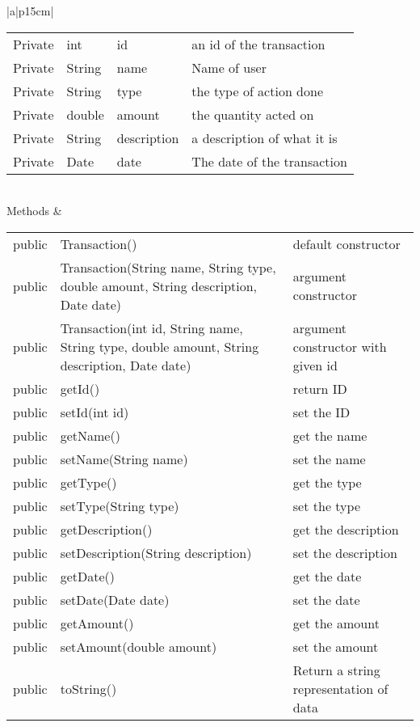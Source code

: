 \documentclass[12pt]{article}
\begin{document}
\begin{table}
\begin{tabular}{|a|p{15cm}|}
\begin{tabular}{| p{2cm} | p{2cm} | p{3cm} | p{6.45cm} |}
			Private & int & id & an id of the transaction \\
			Private & String & name & Name of user\\
			Private & String & type & the type of action done \\
			Private & double & amount & the quantity acted on \\
			Private & String & description & a description of what it is \\
			Private & Date & date & The date of the transaction \\
		\end{tabular} \\
		\hline
		Methods & 		 
		\begin{tabular}{| p{2cm} | p{5cm} | p{6.9cm} |}
			\hline
			\rowcolor{gray}
			\mc{1}{Visibility} &\mc{1}{Name} & \mc{1}{Description} \\
			\hline
			\rowcolor{white}
			public &  Transaction() & default constructor\\
			\hline
			public &  Transaction(String name, String type, double amount, String description, Date date) & argument constructor\\
			\hline
			public & Transaction(int id, String name, String type, double amount, String description, Date date) & argument constructor with given id\\
			\hline
			public &   getId() & return ID\\
			\hline
			public &  setId(int id) &  set the ID\\
			\hline
			public &  getName()  & get the name\\
			\hline
			public &  setName(String name)  & set the name\\
			\hline
			public &  getType() & get the type\\
			\hline
			public &  setType(String type) & set the type\\
			\hline
			public &  getDescription() & get the description\\
			\hline
			public & setDescription(String description) & set the description\\
			\hline
			public &  getDate() & get the date\\
			\hline
			public &  setDate(Date date)  & set the date\\
			\hline
			public &  getAmount() & get the amount\\
			\hline
			public &   setAmount(double amount) & set the amount\\
			\hline
			public &  toString() & Return a string representation of data\\
			\hline
			
		\end{tabular}								 
	\end{tabular}
\end{table}
\end{document}
